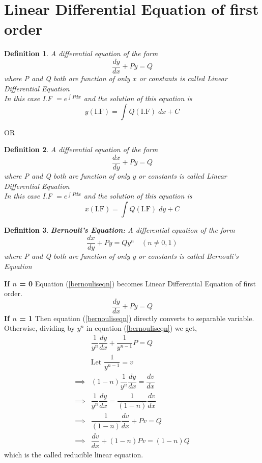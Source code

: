 \documentclass[a4paper, titlepage]{article}
\newtheorem{definition}{Definition}[section]
\begin{document}
\section{Linear Differential Equation of first order}
    \begin{definition}
        A differential equation of the form 
        \[ \dfrac{dy}{dx} + Py = Q \] where P and Q both are function 
        of only $x$ or constants is called Linear Differential Equation \\
        In this case I.F \( = e^{\int Pdx} \) and the solution of this 
        equation is 
        \[ y(\text{I.F}) = \displaystyle\int Q(\text{I.F}) \; dx + C\]    
    \end{definition}
    \begin{center}
        OR
    \end{center}
    \begin{definition}
        A differential equation of the form 
        \[ \dfrac{dx}{dy} + Py = Q \] where P and Q both are function 
        of only $y$ or constants is called Linear Differential Equation \\
        In this case I.F \( = e^{\int Pdx} \) and the solution of this 
        equation is 
        \[ x(\text{I.F}) = \displaystyle\int Q(\text{I.F}) \; dy + C\]    
    \end{definition}
    \begin{definition}
        \textup{\textbf{Bernouli's Equation: }} A differential equation of the form 
        \setcounter{equation}{0}
        \begin{equation}
            \label{bernouliseqn}
            \dfrac{dx}{dy} + Py = Qy^n \quad (n \neq 0, 1)
        \end{equation}
        where P and Q both are function 
        of only $y$ or constants is called Bernouli's Equation \\
    \end{definition}
    \textbf{If $n$ = 0} Equation (\ref{bernouliseqn}) becomes 
    Linear Differential Equation of first order.
    \[ \dfrac{dy}{dx} + Py = Q \] 
    \textbf{If $n$ = 1} Then equation (\ref{bernouliseqn}) directly
    converts to separable variable. Otherwise, dividing by $y^n$ in 
    equation (\ref{bernouliseqn}) we get,
    \begin{align*}
        & \dfrac{1}{y^n} \dfrac{dy}{dx} + \dfrac{1}{y^{n-1}} P = Q \\
        & \text{Let } \dfrac{1}{y^{n-1}} = v \\
        \implies & (1-n)\dfrac{1}{y^n} \dfrac{dy}{dx} = \dfrac{dv}{dx} \\ 
        \implies & \dfrac{1}{y^n} \dfrac{dy}{dx} = \dfrac{1}{(1-n)} \dfrac{dv}{dx} \\
        \implies & \dfrac{1}{(1-n)} \dfrac{dv}{dx} + Pv = Q \\
        \implies & \dfrac{dv}{dx} + (1-n)Pv = (1-n)Q 
    \end{align*}
    which is the called reducible linear equation.
\end{document}
